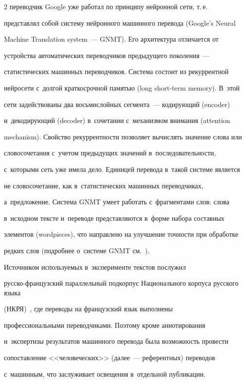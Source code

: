 \begin{multicols}{2}
переводчик Google уже работал по принципу нейронной сети, т.\,е.\ 


пред\-став\-лял собой систему нейронного машинного перевода (Google's Neural 


Machine Translation system~--- GNMT). Его архитектура отличается от 


устройства автоматических переводчиков предыду\-ще\-го поколения~--- 


статистических машинных переводчиков. Система со\-сто\-ит из рекуррентной 


нейросети с~долгой крат\-ко\-сроч\-ной памятью (long short-term memory). В~этой 


сети задействованы два восьмислойных сегмента~--- ко\-ди\-ру\-ющий (encoder) 


и~де\-ко\-ди\-ру\-ющий (decoder) в~сочетании с~механизмом внимания (attention 


mechanism). Свойство рекуррентности поз\-во\-ля\-ет вы\-чис\-лять значение слова или 


словосочетания с~учетом предыду\-щих значений в~последовательности, 


с~которыми сеть уже имела дело. Единицей перевода в~такой системе является 


не словосочетание, как в~статистических машинных переводчиках, 


а~предложение. Система GNMT умеет работать с~фрагментами слов: слова 


в~исходном тексте и~переводе представляются в~форме набора составных 


элементов (wordpieces), что направлено на улучшение точности при обработке 


редких слов (подробнее о~системе GNMT см.~\cite{10-gz, 11-gz}).


  


  Источником используемых в~эксперименте текстов послужил 


  рус\-ско-фран\-цуз\-ский параллельный подкорпус Национального корпуса русского языка 


(НКРЯ)~\cite{12-gz}, где переводы на французский язык выполнены 


профессиональными переводчиками. Поэтому кроме аннотирования 


и~экспертизы результатов машинного перевода была возможность провести 


сопоставление <<человеческих>> (далее~--- референтных) переводов 


с~машинным, что заслуживает освещения в~отдельной пуб\-ли\-кации.



\end{multicols}
